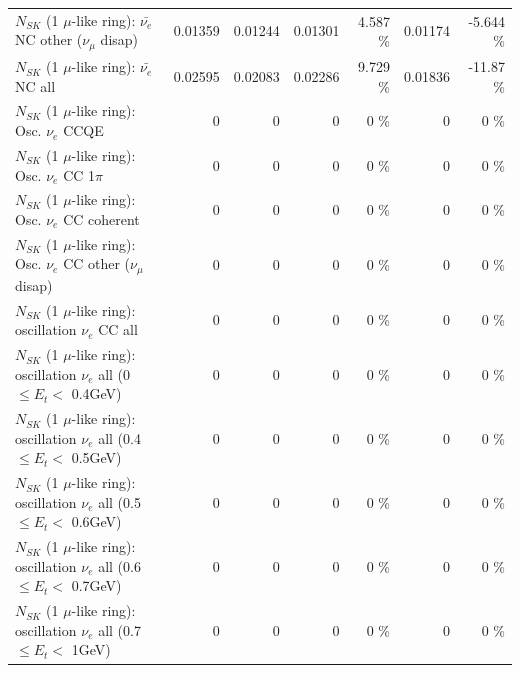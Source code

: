 \begin{table}
\begin{tabular}{| l | r | r | r  r | r  r |}
          $N_{SK}$ (1 $\mu$-like ring): $\bar{\nu_e}$ NC other ($\nu_\mu$ disap) &         0.01359 &         0.01244 &         0.01301 &    4.587 \%  &         0.01174 &   -5.644 \%  \\ 
                            $N_{SK}$ (1 $\mu$-like ring): $\bar{\nu_{e}}$ NC all &         0.02595 &         0.02083 &         0.02286 &    9.729 \%  &         0.01836 &   -11.87 \%  \\ 
\hline
\hline
\hline
                                 $N_{SK}$ (1 $\mu$-like ring): Osc. $\nu_e$ CCQE &               0 &               0 &               0 &        0 \%  &               0 &        0 \%  \\ 
                            $N_{SK}$ (1 $\mu$-like ring): Osc. $\nu_e$ CC 1$\pi$ &               0 &               0 &               0 &        0 \%  &               0 &        0 \%  \\ 
                          $N_{SK}$ (1 $\mu$-like ring): Osc. $\nu_e$ CC coherent &               0 &               0 &               0 &        0 \%  &               0 &        0 \%  \\ 
           $N_{SK}$ (1 $\mu$-like ring): Osc. $\nu_e$ CC other ($\nu_\mu$ disap) &               0 &               0 &               0 &        0 \%  &               0 &        0 \%  \\ 
                        $N_{SK}$ (1 $\mu$-like ring): oscillation $\nu_e$ CC all &               0 &               0 &               0 &        0 \%  &               0 &        0 \%  \\ 
\hline
$N_{SK}$ (1 $\mu$-like ring): oscillation $\nu_{e}$ all (0 $\leq E_{t} <$ 0.4GeV) &               0 &               0 &               0 &        0 \%  &               0 &        0 \%  \\ 
$N_{SK}$ (1 $\mu$-like ring): oscillation $\nu_{e}$ all (0.4 $\leq E_{t} <$ 0.5GeV) &               0 &               0 &               0 &        0 \%  &               0 &        0 \%  \\ 
$N_{SK}$ (1 $\mu$-like ring): oscillation $\nu_{e}$ all (0.5 $\leq E_{t} <$ 0.6GeV) &               0 &               0 &               0 &        0 \%  &               0 &        0 \%  \\ 
$N_{SK}$ (1 $\mu$-like ring): oscillation $\nu_{e}$ all (0.6 $\leq E_{t} <$ 0.7GeV) &               0 &               0 &               0 &        0 \%  &               0 &        0 \%  \\ 
$N_{SK}$ (1 $\mu$-like ring): oscillation $\nu_{e}$ all (0.7 $\leq E_{t} <$ 1GeV) &               0 &               0 &               0 &        0 \%  &               0 &        0 \%  \\ 

\end{tabular}
\end{table}
